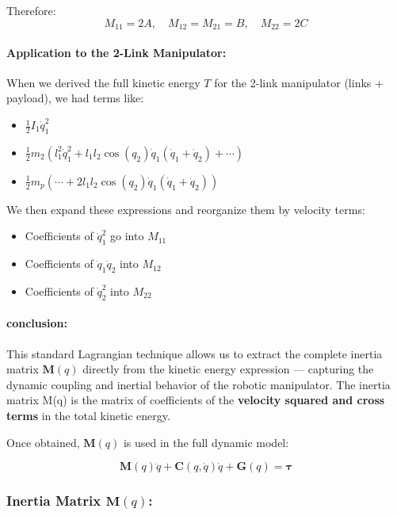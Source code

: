 \documentclass[a4paper,12pt]{article}
\begin{document}
\noindent Therefore:
\[
M_{11} = 2A, \quad M_{12} = M_{21} = B, \quad M_{22} = 2C
\]

\paragraph{Application to the 2-Link Manipulator:}
When we derived the full kinetic energy $T$ for the 2-link manipulator (links + payload), we had terms like:

\begin{itemize}
    \item $\frac{1}{2} I_1 \dot{q}_1^2$
    \item $\frac{1}{2} m_2 \left( l_1^2 \dot{q}_1^2 + l_1 l_2 \cos(q_2) \dot{q}_1 (\dot{q}_1 + \dot{q}_2) + \cdots \right)$
    \item $\frac{1}{2} m_p \left( \cdots + 2 l_1 l_2 \cos(q_2) \dot{q}_1 (\dot{q}_1 + \dot{q}_2) \right)$
\end{itemize}

We then expand these expressions and reorganize them by velocity terms:

\begin{itemize}
    \item Coefficients of $\dot{q}_1^2$ go into $M_{11}$
    \item Coefficients of $\dot{q}_1 \dot{q}_2$ into $M_{12}$
    \item Coefficients of $\dot{q}_2^2$ into $M_{22}$
\end{itemize}

\paragraph{conclusion:}
This standard Lagrangian technique allows us to extract the complete inertia matrix $\mathbf{M}(q)$ directly from the kinetic energy expression — capturing the dynamic coupling and inertial behavior of the robotic manipulator.
The inertia matrix M(q) is the matrix of coefficients of the \textbf{velocity squared and cross terms} in the total kinetic energy. 

Once obtained, $\mathbf{M}(q)$ is used in the full dynamic model:

\[
\mathbf{M}(q)\ddot{q} + \mathbf{C}(q, \dot{q})\dot{q} + \mathbf{G}(q) = \boldsymbol{\tau}
\]


\subsubsection*{Inertia Matrix $\mathbf{M}(q)$:}
\end{document}
